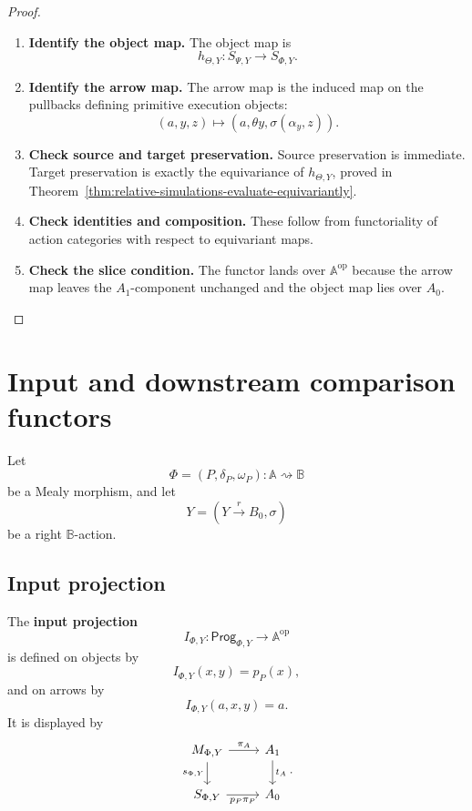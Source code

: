 \begin{proof}
\leavevmode
\begin{enumerate}
\item \textbf{Identify the object map.}
The object map is
\[
h_{\Theta,Y}:S_{\Psi,Y}\to S_{\Phi,Y}.
\]

\item \textbf{Identify the arrow map.}
The arrow map is the induced map on the pullbacks defining primitive execution
objects:
\[
(a,y,z)\longmapsto
(a,\theta y,\sigma(\alpha_y,z)).
\]

\item \textbf{Check source and target preservation.}
Source preservation is immediate. Target preservation is exactly the
equivariance of \(h_{\Theta,Y}\), proved in
Theorem~\ref{thm:relative-simulations-evaluate-equivariantly}.

\item \textbf{Check identities and composition.}
These follow from functoriality of action categories with respect to
equivariant maps.

\item \textbf{Check the slice condition.}
The functor lands over \(\mathbb A^{\mathrm{op}}\) because the arrow map leaves
the \(A_1\)-component unchanged and the object map lies over \(A_0\).
\end{enumerate}
\end{proof}

\section{Input and downstream comparison functors}
\label{sec:relative-input-downstream-comparison}

Let
\[
\Phi=(P,\delta_P,\omega_P):\mathbb A\rightsquigarrow\mathbb B
\]
be a Mealy morphism, and let
\[
Y=(Y\xrightarrow{r}B_0,\sigma)
\]
be a right \(\mathbb B\)-action.

\subsection{Input projection}
\label{subsec:relative-input-projection}

\begin{definition}
\label{def:relative-input-projection}
The \textbf{input projection}
\[
I_{\Phi,Y}:\mathsf{Prog}_{\Phi,Y}\to\mathbb A^{\mathrm{op}}
\]
is defined on objects by
\[
I_{\Phi,Y}(x,y)=p_P(x),
\]
and on arrows by
\[
I_{\Phi,Y}(a,x,y)=a.
\]
It is displayed by
\[
\begin{tikzcd}
M_{\Phi,Y}
\arrow[r,"\pi_A"]
\arrow[d,"s_{\Phi,Y}"']
&
A_1
\arrow[d,"t_A"]
\\
S_{\Phi,Y}
\arrow[r,"p_P\pi_P"']
&
A_0
\end{tikzcd}
.
\]
\end{definition}


